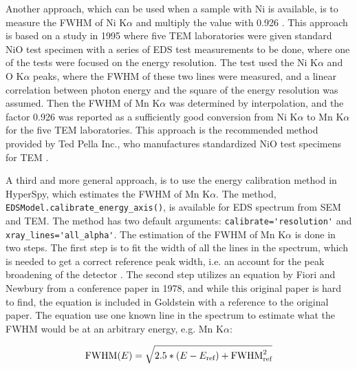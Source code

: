 Another approach, which can be used when a sample with Ni is available, is to measure the FWHM of Ni K$\alpha$ and multiply the value with 0.926 \cite{bennett_egerton_1995}.
This approach is based on a study in 1995 where five TEM laboratories were given  standard NiO test specimen with a series of EDS test measurements to be done, where one of the tests were focused on the energy resolution.
The test used the Ni K$\alpha$ and O K$\alpha$ peaks, where the FWHM of these two lines were measured, and a linear correlation between photon energy and the square of the energy resolution was assumed.
Then the FWHM of Mn K$\alpha$ was determined by interpolation, and the factor 0.926 was reported as a sufficiently good conversion from Ni K$\alpha$ to Mn K$\alpha$ for the five TEM laboratories.
This approach is the recommended method provided by Ted Pella Inc., who manufactures standardized NiO test specimens for TEM \cite{egerton_nio_characterization_1994,ted_pella_nio_tem_2019}.


A third and more general approach, is to use the energy calibration method in HyperSpy, which estimates the FWHM of Mn K$\alpha$.
The method, \verb|EDSModel.calibrate_energy_axis()|, is available for EDS spectrum from SEM and TEM.
The method has two default arguments: \verb|calibrate='resolution'| and \verb|xray_lines='all_alpha'|.
The estimation of the FWHM of Mn K$\alpha$ is done in two steps.
The first step is to fit the width of all the lines in the spectrum, which is needed to get a correct reference peak width, i.e. an account for the peak broadening of the detector .
The second step utilizes an equation by Fiori and Newbury from a conference paper in 1978, and while this original paper is hard to find, the equation is included in Goldstein \cite[Ch. 16.1.1]{goldstein_scanning_2018} with a reference to the original paper.
The equation use one known line in the spectrum to estimate what the FWHM would be at an arbitrary energy, e.g. Mn K$\alpha$:

\begin{equation}
    \label{eq:estimateFWHM}
    \textnormal{FWHM}(E) =  \sqrt{2.5 * (E - E_\textnormal{ref}) + \textnormal{FWHM}^2_{\textnormal{ref}}}
\end{equation}

